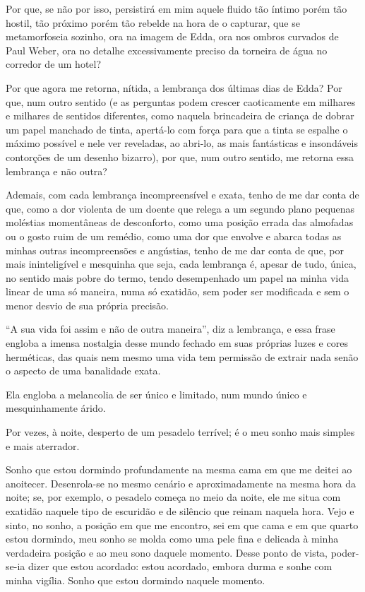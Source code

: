 Por que, se não por isso, persistirá em mim aquele fluido tão íntimo porém tão hostil, tão próximo porém tão rebelde na hora de o capturar, que se metamorfoseia sozinho, ora na imagem de Edda, ora nos ombros curvados de Paul Weber, ora no detalhe excessivamente preciso da torneira de água no corredor de um hotel?

Por que agora me retorna, nítida, a lembrança dos últimas dias de Edda? Por que, num outro sentido (e as perguntas podem crescer caoticamente em milhares e milhares de sentidos diferentes, como naquela brincadeira de criança de dobrar um papel manchado de tinta, apertá-lo com força para que a tinta se espalhe o máximo possível e nele ver reveladas, ao abri-lo, as mais fantásticas e insondáveis contorções de um desenho bizarro), por que, num outro sentido, me retorna essa lembrança e não outra?

Ademais, com cada lembrança incompreensível e exata, tenho de me dar conta de que, como a dor violenta de um doente que relega a um segundo plano pequenas moléstias momentâneas de desconforto, como uma posição errada das almofadas ou o gosto ruim de um remédio, como uma dor que envolve e abarca todas as minhas outras incompreensões e angústias, tenho de me dar conta de que, por mais ininteligível e mesquinha que seja, cada lembrança é, apesar de tudo, única, no sentido mais pobre do termo, tendo desempenhado um papel na minha vida linear de uma só maneira, numa só exatidão, sem poder ser modificada e sem o menor desvio de sua própria precisão.

``A sua vida foi assim e não de outra maneira'', diz a lembrança, e essa frase engloba a imensa nostalgia desse mundo fechado em suas próprias luzes e cores herméticas, das quais nem mesmo uma vida tem permissão de extrair nada senão o aspecto de uma banalidade exata.

Ela engloba a melancolia de ser único e limitado, num mundo único e mesquinhamente árido.

Por vezes, à noite, desperto de um pesadelo terrível; é o meu sonho mais simples e mais aterrador.

Sonho que estou dormindo profundamente na mesma cama em que me deitei ao anoitecer. Desenrola-se no mesmo cenário e aproximadamente na mesma hora da noite; se, por exemplo, o pesadelo começa no meio da noite, ele me situa com exatidão naquele tipo de escuridão e de silêncio que reinam naquela hora. Vejo e sinto, no sonho, a posição em que me encontro, sei em que cama e em que quarto estou dormindo, meu sonho se molda como uma pele fina e delicada à minha verdadeira posição e ao meu sono daquele momento. Desse ponto de vista, poder-se-ia dizer que estou acordado: estou acordado, embora durma e sonhe com minha vigília. Sonho que estou dormindo naquele momento.

